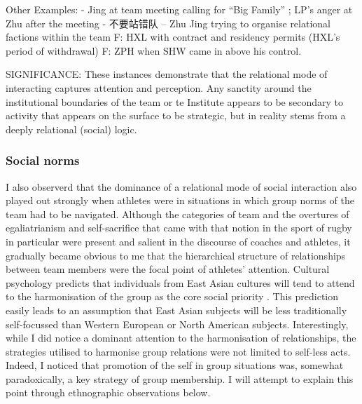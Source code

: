 Other Examples:
- Jing at team meeting calling for ``Big Family'' ; LP's anger at Zhu after the meeting
- 不要站错队 -- Zhu Jing trying to organise relational factions within the team
F: HXL with contract and residency permits (HXL's period of withdrawal)
F: ZPH when SHW came in above his control.

SIGNIFICANCE: These instances demonstrate that the relational mode of interacting captures attention and perception. Any sanctity around the institutional boundaries of the team or te Institute appears to be secondary to activity that appears on the surface to be strategic, but in reality stems from a deeply relational (social) logic.







    \subsubsection{Social norms}

I also observerd that the dominance of a relational mode of social interaction also played out strongly when athletes were in situations in which group norms of the team had to be navigated.  Although the categories of team and the overtures of egaliatrianism and self-sacrifice that came with that notion in the sport of rugby in particular were present and salient in the discourse of coaches and athletes, it gradually became obvious to me that the hierarchical structure of relationships between team members were the focal point of athletes' attention.  Cultural psychology predicts that individuals from East Asian cultures will tend to attend to the harmonisation of the group as the core social priority \citep{Yuki2003}.  This prediction easily leads to an assumption that East Asian subjects will be less traditionally self-focussed than Western European or North American subjects.  Interestingly, while I did notice a dominant attention to the harmonisation of relationships, the strategies utilised to harmonise group relations were not limited to self-less acts.  Indeed, I noticed that promotion of the self in group situations was, somewhat paradoxically, a key strategy of group membership.  I will attempt to explain this point through ethnographic observations below.

